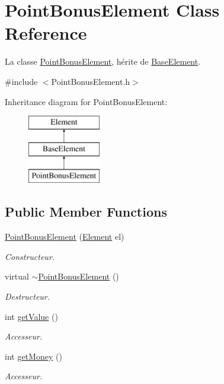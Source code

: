 \hypertarget{classPointBonusElement}{\section{Point\-Bonus\-Element Class Reference}
\label{classPointBonusElement}
}


La classe \hyperlink{classPointBonusElement}{Point\-Bonus\-Element}, hérite de \hyperlink{classBaseElement}{Base\-Element}.  




{\ttfamily \#include $<$Point\-Bonus\-Element.\-h$>$}

Inheritance diagram for Point\-Bonus\-Element\-:\begin{figure}[H]
\begin{center}
\leavevmode
\includegraphics[height=3.000000cm]{classPointBonusElement}
\end{center}
\end{figure}
\subsection*{Public Member Functions}
\begin{DoxyCompactItemize}
\item 
\hyperlink{classPointBonusElement_a79141a25bc092d979a06e0ef0b618cd2}{Point\-Bonus\-Element} (\hyperlink{classElement}{Element} el)
\begin{DoxyCompactList}\small\item\em Constructeur. \end{DoxyCompactList}\item 
virtual \hyperlink{classPointBonusElement_a6e0edec449969d256c70c2cd6e238ab0}{$\sim$\-Point\-Bonus\-Element} ()
\begin{DoxyCompactList}\small\item\em Destructeur. \end{DoxyCompactList}\item 
int \hyperlink{classPointBonusElement_a5766494f3f66abcda8bd125779b4082a}{get\-Value} ()
\begin{DoxyCompactList}\small\item\em Accesseur. \end{DoxyCompactList}\item 
int \hyperlink{classPointBonusElement_ad8cea3552abfcbb657b29575798b45cb}{get\-Money} ()
\begin{DoxyCompactList}\small\item\em Accesseur. \end{DoxyCompactList}\end{DoxyCompactItemize}
